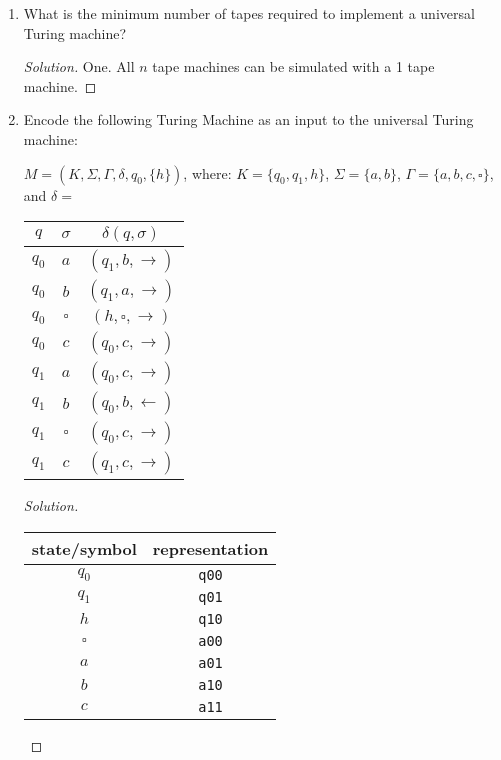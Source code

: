 \documentclass[10pt]{article}
\begin{document}
\begin{enumerate}[1)]

\item
What is the minimum number of tapes required to implement a universal Turing machine?
\begin{proof}[Solution]
One.  All $n$ tape machines can be simulated with a 1 tape machine.
\end{proof}


\item
Encode the following Turing Machine as an input to the universal Turing machine:
\begin{center}
$M = (K, \Sigma, \Gamma, \delta, q_0, \{h\})$, where:   $K = \{q_0, q_1, h\}$,  $\Sigma = \{a, b\}$,  $\Gamma = \{a, b, c, \square\}$, and $\delta =$\\
\vspace{.5cm}
\begin{tabular}{|c|c|c|}
\hline
$q$&$\sigma$&$\delta(q, \sigma)$\\ \hline
$q_0$&$a$&$(q_1, b, \rightarrow)$\\ \hline
$q_0$&$b$&$(q_1, a, \rightarrow)$\\ \hline
$q_0$&$\square$&$(h, \square, \rightarrow)$\\ \hline
$q_0$&$c$&$(q_0, c, \rightarrow)$\\ \hline
$q_1$&$a$&$(q_0, c, \rightarrow)$\\ \hline
$q_1$&$b$&$(q_0, b, \leftarrow)$\\ \hline
$q_1$&$\square$&$(q_0, c, \rightarrow)$\\ \hline
$q_1$&$c$&$(q_1, c, \rightarrow)$\\
\hline
\end{tabular}
\end{center}
\begin{proof}[Solution]$ $\\
\begin{center}
\begin{tabular}{|c|c|}
\hline
state/symbol&representation\\ \hline
$q_0$&\texttt{q00}\\ \hline
$q_1$&\texttt{q01}\\ \hline
$h$&\texttt{q10}\\ \hline
$\square$&\texttt{a00}\\ \hline
$a$&\texttt{a01}\\ \hline
$b$&\texttt{a10}\\ \hline
$c$&\texttt{a11}\\

\end{tabular}
\end{center}
\end{proof}
\end{enumerate}
\end{document}

